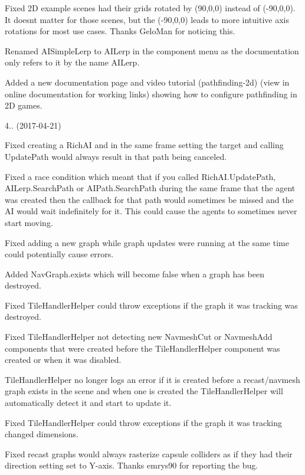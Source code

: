 \begin{DoxyItemize}
\begin{DoxyItemize}
\item Fixed 2D example scenes had their grids rotated by (90,0,0) instead of (-\/90,0,0). It doesn\textquotesingle{}t matter for those scenes, but the (-\/90,0,0) leads to more intuitive axis rotations for most use cases. Thanks Gelo\+Man for noticing this.
\item Renamed A\+I\+Simple\+Lerp to A\+I\+Lerp in the component menu as the documentation only refers to it by the name \textquotesingle{}A\+I\+Lerp\textquotesingle{}.
\item Added a new documentation page and video tutorial (pathfinding-\/2d) (view in online documentation for working links) showing how to configure pathfinding in 2D games.
\end{DoxyItemize}
\item 4.. (2017-\/04-\/21)
\begin{DoxyItemize}
\item Fixed creating a Rich\+AI and in the same frame setting the target and calling Update\+Path would always result in that path being canceled.
\item Fixed a race condition which meant that if you called Rich\+A\+I.\+Update\+Path, A\+I\+Lerp.\+Search\+Path or A\+I\+Path.\+Search\+Path during the same frame that the agent was created then the callback for that path would sometimes be missed and the AI would wait indefinitely for it. This could cause the agents to sometimes never start moving.
\item Fixed adding a new graph while graph updates were running at the same time could potentially cause errors.
\item Added Nav\+Graph.\+exists which will become false when a graph has been destroyed.
\item Fixed Tile\+Handler\+Helper could throw exceptions if the graph it was tracking was destroyed.
\item Fixed Tile\+Handler\+Helper not detecting new Navmesh\+Cut or Navmesh\+Add components that were created before the Tile\+Handler\+Helper component was created or when it was disabled.
\item Tile\+Handler\+Helper no longer logs an error if it is created before a recast/navmesh graph exists in the scene and when one is created the Tile\+Handler\+Helper will automatically detect it and start to update it.
\item Fixed Tile\+Handler\+Helper could throw exceptions if the graph it was tracking changed dimensions.
\item Fixed recast graphs would always rasterize capsule colliders as if they had their \textquotesingle{}direction\textquotesingle{} setting set to \textquotesingle{}Y-\/axis\textquotesingle{}. Thanks emrys90 for reporting the bug.

\end{DoxyItemize}
\end{DoxyItemize}
